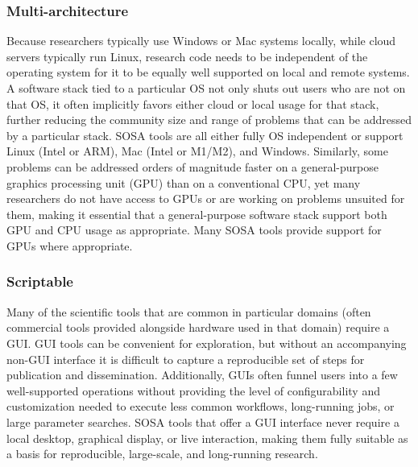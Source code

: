 \subsubsection{Multi-architecture}
Because researchers typically use Windows or Mac systems locally, while cloud servers typically run Linux, research code needs to be independent of the operating system for it to be equally well supported on local and remote systems. A software stack tied to a particular OS not only shuts out users who are not on that OS, it often implicitly favors either cloud or local usage for that stack, further reducing the community size and range of problems that can be addressed by a particular stack. SOSA tools are all either fully OS independent or support Linux (Intel or ARM), Mac (Intel or M1/M2), and Windows. Similarly, some problems can be addressed orders of magnitude faster on a general-purpose graphics processing unit (GPU) than on a conventional CPU, yet many researchers do not have access to GPUs or are working on problems unsuited for them, making it essential that a general-purpose software stack support both GPU and CPU usage as appropriate. Many SOSA tools provide support for GPUs where appropriate.

\subsubsection{Scriptable}
Many of the scientific tools that are common in particular domains (often commercial tools provided alongside hardware used in that domain) require a GUI. GUI tools can be convenient for exploration, but without an accompanying non-GUI interface it is difficult to capture a reproducible set of steps for publication and dissemination. Additionally, GUIs often funnel users into a few well-supported operations without providing the level of configurability and customization needed to execute less common workflows, long-running jobs, or large parameter searches. SOSA tools that offer a GUI interface never require a local desktop, graphical display, or live interaction, making them fully suitable as a basis for reproducible, large-scale, and long-running research.

